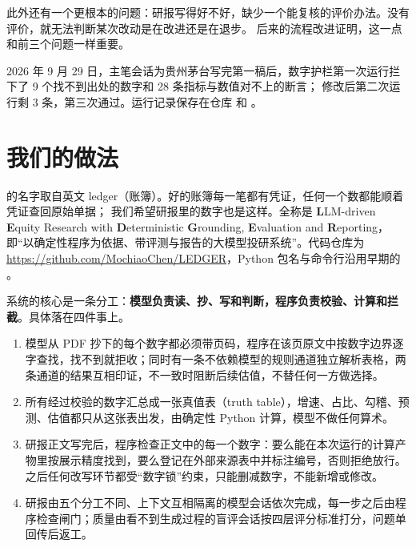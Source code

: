 此外还有一个更根本的问题：研报写得好不好，缺少一个能复核的评价办法。没有评价，就无法判断某次改动是在改进还是在退步。
后来的流程改进证明，这一点和前三个问题一样重要。

\begin{note}[一次真实的拦截记录]
2026 年 9 月 29 日，主笔会话为贵州茅台写完第一稿后，数字护栏第一次运行拦下了 9 个找不到出处的数字和 28 条指标与数值对不上的断言；
修改后第二次运行剩 3 条，第三次通过。运行记录保存在仓库  和 。
\end{note}

\section{我们的做法}

\sysname{} 的名字取自英文 ledger（账簿）。好的账簿每一笔都有凭证，任何一个数都能顺着凭证查回原始单据；
我们希望研报里的数字也是这样。全称是 \textbf{L}LM-driven \textbf{E}quity Research with \textbf{D}eterministic \textbf{G}rounding,
\textbf{E}valuation and \textbf{R}eporting，即“以确定性程序为依据、带评测与报告的大模型投研系统”。代码仓库为 \url{https://github.com/MochiaoChen/LEDGER}，Python 包名与命令行沿用早期的 。

系统的核心是一条分工：\textbf{模型负责读、抄、写和判断，程序负责校验、计算和拦截}。具体落在四件事上。
\begin{enumerate}
  \item 模型从 PDF 抄下的每个数字都必须带页码，程序在该页原文中按数字边界逐字查找，找不到就拒收；同时有一条不依赖模型的规则通道独立解析表格，两条通道的结果互相印证，不一致时阻断后续估值，不替任何一方做选择。
  \item 所有经过校验的数字汇总成一张真值表（truth table），增速、占比、勾稽、预测、估值都只从这张表出发，由确定性 Python 计算，模型不做任何算术。
  \item 研报正文写完后，程序检查正文中的每一个数字：要么能在本次运行的计算产物里按展示精度找到，要么登记在外部来源表中并标注编号，否则拒绝放行。之后任何改写环节都受“数字锁”约束，只能删减数字，不能新增或修改。
  \item 研报由五个分工不同、上下文互相隔离的模型会话依次完成，每一步之后由程序检查闸门；质量由看不到生成过程的盲评会话按四层评分标准打分，问题单回传后返工。
\end{enumerate}

